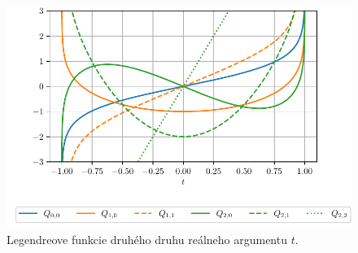 \documentclass[a4paper, 12pt]{book}
\begin{document}
\begin{figure}
\centering
\includegraphics{./fig-legendre-functions-qnm.pdf}
\caption{Legendreove funkcie druhého druhu reálneho argumentu $t$.}
\label{fig:lf_2nd}
\end{figure}
\end{document}
